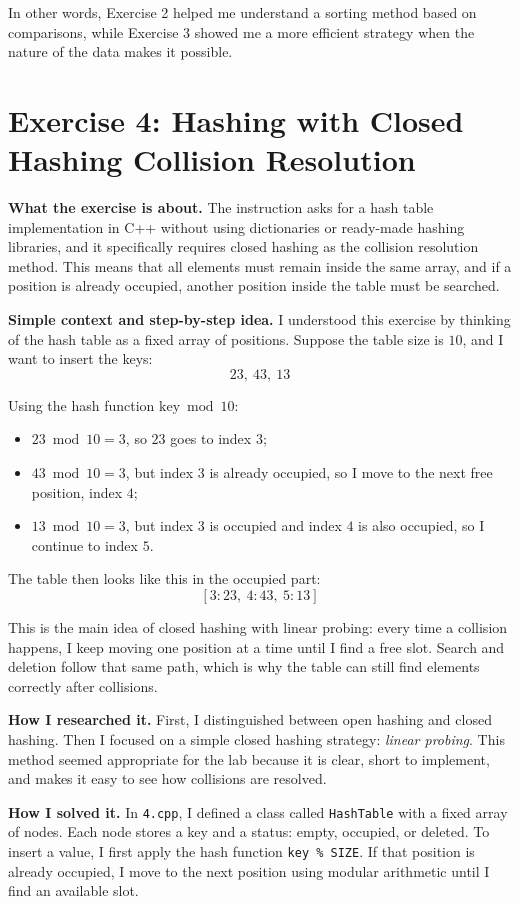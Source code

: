 \documentclass[12pt,a4paper]{article}
\begin{document}
In other words, Exercise 2 helped me understand a sorting method based on comparisons, while Exercise 3 showed me a more efficient strategy when the nature of the data makes it possible.

\section*{Exercise 4: Hashing with Closed Hashing Collision Resolution}
\textbf{What the exercise is about.} The instruction asks for a hash table implementation in C++ without using dictionaries or ready-made hashing libraries, and it specifically requires closed hashing as the collision resolution method. This means that all elements must remain inside the same array, and if a position is already occupied, another position inside the table must be searched.

\textbf{Simple context and step-by-step idea.} I understood this exercise by thinking of the hash table as a fixed array of positions. Suppose the table size is \(10\), and I want to insert the keys:
\[
23,\ 43,\ 13
\]

Using the hash function \(\text{key} \bmod 10\):
\begin{itemize}
\item \(23 \bmod 10 = 3\), so \(23\) goes to index \(3\);
\item \(43 \bmod 10 = 3\), but index \(3\) is already occupied, so I move to the next free position, index \(4\);
\item \(13 \bmod 10 = 3\), but index \(3\) is occupied and index \(4\) is also occupied, so I continue to index \(5\).
\end{itemize}

The table then looks like this in the occupied part:
\[
[3:23,\ 4:43,\ 5:13]
\]

This is the main idea of closed hashing with linear probing: every time a collision happens, I keep moving one position at a time until I find a free slot. Search and deletion follow that same path, which is why the table can still find elements correctly after collisions.

\textbf{How I researched it.} First, I distinguished between open hashing and closed hashing. Then I focused on a simple closed hashing strategy: \textit{linear probing}. This method seemed appropriate for the lab because it is clear, short to implement, and makes it easy to see how collisions are resolved.

\textbf{How I solved it.} In \texttt{4.cpp}, I defined a class called \texttt{HashTable} with a fixed array of nodes. Each node stores a key and a status: empty, occupied, or deleted. To insert a value, I first apply the hash function \texttt{key \% SIZE}. If that position is already occupied, I move to the next position using modular arithmetic until I find an available slot.
\end{document}
